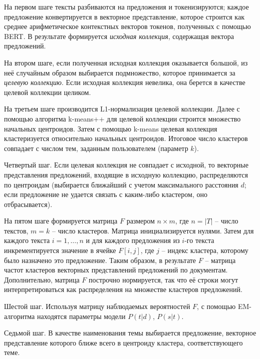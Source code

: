 На первом шаге тексты разбиваются на предложения и токенизируются; каждое предложение конвертируется в векторное представление, которое строится как среднее арифметическое контекстных векторов токенов, полученных с помощью BERT. В результате формируется \textit{исходная коллекция}, содержащая вектора предложений.

На втором шаге, если полученная исходная коллекция оказывается большой, из неё случайным образом выбирается подмножество, которое принимается за \textit{целевую коллекцию}. Если исходная коллекция невелика, она берется в качестве целевой коллекции целиком.

На третьем шаге производится L1-нормализация целевой коллекции. Далее с помощью алгоритма k-means++ для целевой коллекции строится множество начальных центроидов. Затем с помощью k-means целевая коллекция кластеризуется относительно начальных центроидов. Итоговое число кластеров совпадает с числом тем, заданным пользователем (параметр $k$).

Четвертый шаг. Если целевая коллекция не совпадает с исходной, то векторные представления предложений, входящие в исходную коллекцию, распределяются по центроидам (выбирается ближайший с учетом максимального расстояния $d$; если предложение не удается связать с каким-либо кластером, оно отбрасывается).

На пятом шаге формируется матрица $F$ размером $n \times m$, где $n = |T|$ -- число текстов, $m = k$ -- число кластеров. Матрица инициализируется нулями. Затем для каждого текста $i = 1, \ldots, n$ и для каждого предложения из $i$-го текста инкрементируется значение в ячейке $F[i, j]$, где $j$ -- индекс кластера, которому было назначено это предложение. Таким образом, в результате $F$ -- матрица частот кластеров векторных представлений предложений по документам. Дополнительно, матрица $F$ построчно нормируется, так что её строки могут интерпретироваться как распределения на множестве кластеров предложений.

Шестой шаг. Используя матрицу наблюдаемых вероятностей $F$, с помощью EM-алгоритма находятся параметры модели $P(t|d)$, $P(s|t)$.

Седьмой шаг. В качестве наименования темы выбирается предложение, векторное представление которого ближе всего в центроиду кластера, соответствующего теме.

